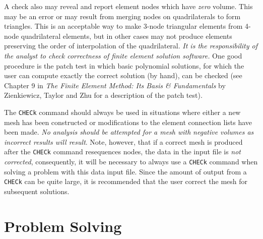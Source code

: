 A check
also may reveal and report element nodes which have {\it zero} volume.
This may be an error or may result from merging nodes on quadrilaterals
to form triangles.  This is an acceptable way to make 3-node triangular
elements from 4-node quadrilateral elements, but in other cases may not
produce elements preserving the order of interpolation of the quadrilateral.
{\it It is the responsibility of the analyst to check correctness of finite
element solution software.} One good procedure is the patch test in which
basic polynomial solutions, for which the user can compute exactly the correct
solution (by hand), can be checked (see Chapter 9 in
\textit{The Finite Element Method: Its Basis \& Fundamentals} by
Zienkiewicz, Taylor and Zhu for a description of the patch test).

The {\tt CHECk} command should always be used in situations where
either a new mesh
has been constructed or modifications to the element connection lists have
been made. {\it No analysis should be attempted for a mesh with}
{\it negative volumes as incorrect results will result}.  Note,
however, that if a correct mesh is produced after
the {\tt CHECk} command resequences nodes,
the data in the input file is {\it not corrected}, consequently, it
will be necessary to always use a {\tt CHECk} command when solving a
problem with this data input file.
Since the amount of output from a {\tt CHECk} can be quite large, it
is recommended that the user correct the mesh for subsequent
solutions.

\section{Problem Solving}

